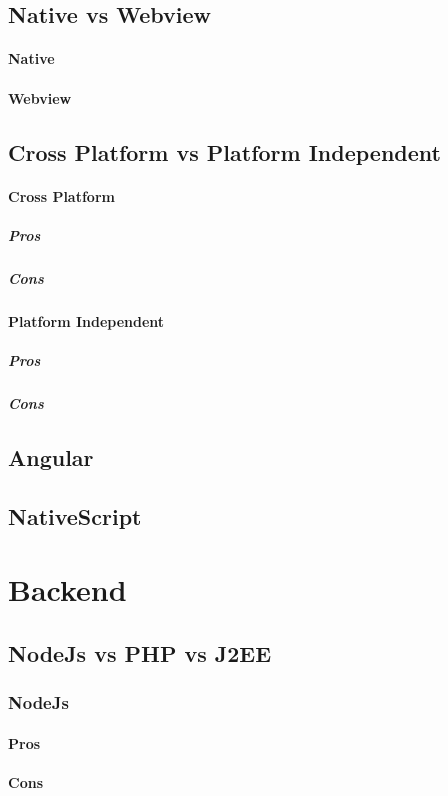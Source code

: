 \documentclass[11pt, openany]{report}
\begin{document}
    \subsection{ Native vs Webview}
      \paragraph{Native}
      \paragraph{Webview}
    \subsection{ Cross Platform vs Platform Independent }
      \paragraph{Cross Platform}
        \subparagraph{Pros}
        \subparagraph{Cons}
      \paragraph{Platform Independent}
        \subparagraph{Pros}
        \subparagraph{Cons}
    \subsection{ Angular }
    \subsection{ NativeScript }
  \section{ Backend }
    \subsection{ NodeJs vs PHP vs J2EE }
      \subsubsection{NodeJs}
        \paragraph{Pros}
        \paragraph{Cons}
\end{document}
